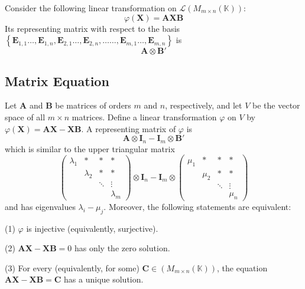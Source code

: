\documentclass[12pt, a4paper, oneside]{book}
\begin{document}
\begin{theorem}
    Consider the following linear transformation on $\mathcal{L}\left(M_{m \times n}\left(\mathbb{K}\right)\right)$:
    \[
        \varphi(\mathbf{X})=\mathbf{A}\mathbf{X}\mathbf{B}
    \]
    Its representing matrix with respect to the basis $\left\{\mathbf{E}_{1,1}\ldots,\mathbf{E}_{1,n},\mathbf{E}_{2,1}\ldots,\mathbf{E}_{2,n},\ldots \ldots ,\mathbf{E}_{m,1}\ldots,\mathbf{E}_{m,n}\right\}$ is
    \[
        \mathbf{A} \otimes \mathbf{B}'
    \]
\end{theorem}


\subsection{Matrix Equation}
\begin{theorem}
    Let $\mathbf{A}$ and $\mathbf{B}$ be matrices of orders $m$ and $n$, respectively, and let $V$ be the vector space of all $m \times n$ matrices. Define a linear transformation ${\varphi}$ on $V$ by ${\varphi}(\mathbf{X})=\mathbf{A} \mathbf{X}-\mathbf{X} \mathbf{B}$.
    A representing matrix of $\varphi$ is
    \[
        \mathbf{A}\otimes \mathbf{I}_n - \mathbf{I}_m\otimes \mathbf{B}'
    \]
    which is similar to the upper triangular matrix
    \[
        \left(\begin{matrix}
                \lambda_1 & * & * & * \\ & \lambda_2 & * & * \\ & & \ddots & \vdots \\ & & & \lambda_m
            \end{matrix}\right) \otimes \mathbf{I}_n
        -
        \mathbf{I}_m\otimes \left(\begin{matrix}
                \mu_1 & *     & *      & *      \\
                      & \mu_2 & *      & *      \\
                      &       & \ddots & \vdots \\
                      &       &        & \mu_n
            \end{matrix}\right)
    \]
    and has eigenvalues $\lambda_i-\mu_j$. Moreover, the following statements are equivalent:

    (1) $\varphi$ is injective (equivalently, surjective).

    (2) $\mathbf{A} \mathbf{X}-\mathbf{X} \mathbf{B}=0$ has only the zero solution.

    (3) For every (equivalently, for some) $\mathbf{C}\in \left(M_{m \times n}\left(\mathbb{K}\right)\right)$, the equation $\mathbf{A} \mathbf{X}-\mathbf{X} \mathbf{B}=\mathbf{C}$ has a unique solution.
\end{theorem}
\end{document}
